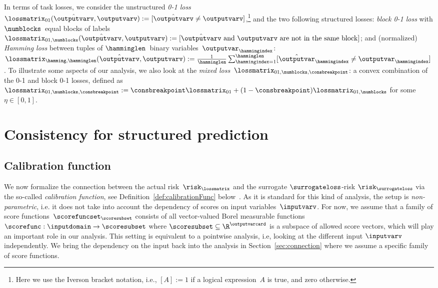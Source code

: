 \documentclass{article}
\begin{document}
In terms of task losses, we consider the unstructured \emph{0-1 loss} $\lossmatrix_{01}(\hat{\outputvarv}, \outputvarv) := [\hat{\outputvarv} \neq \outputvarv]$,\footnote{\label{footnote:Iverson}Here we use the Iverson bracket notation, i.e., $[A] := 1$ if a logical expression~$A$ is true, and zero otherwise.} and the two following structured losses: \emph{block 0-1 loss} with $\numblocks$~equal blocks of labels $\lossmatrix_{01,\numblocks}(\hat{\outputvarv}, \outputvarv) := [\text{$\hat{\outputvarv}$ and $\outputvarv$ are not in the same block}]$; and (normalized) \emph{Hamming loss} between tuples of $\hamminglen$~binary variables~$\outputvar_\hammingindex$: $\lossmatrix_{\hamming,\hamminglen}(\hat{\outputvarv}, \outputvarv)
:=
\frac{1}{\hamminglen}\sum\nolimits_{\hammingindex=1}^\hamminglen [\hat{\outputvar}_\hammingindex \neq \outputvar_\hammingindex]
$.
To illustrate some aspects of our analysis, we also look at the \emph{mixed loss}~$\lossmatrix_{01,\numblocks,\consbreakpoint}$: a convex combination of the 0-1 and block 0-1 losses, defined as $\lossmatrix_{01,\numblocks,\consbreakpoint} := \consbreakpoint \lossmatrix_{01} + (1 - \consbreakpoint) \lossmatrix_{01,\numblocks}$ for some $\eta \in [0,1]$.

\section{Consistency for structured prediction}
\label{sec:consistency}
\subsection{Calibration function}
We now formalize the connection between the actual risk~$\risk_\lossmatrix$ and the surrogate $\surrogateloss$-risk $\risk_\surrogateloss$ via the so-called \emph{calibration function}, see Definition~\ref{def:calibrationFunc} below~\citep{bartlett06convexity,zhang04,steinwart07,duchi10,pires2013riskbounds}.
As it is standard for this kind of analysis, the setup is \emph{non-parametric}, i.e. it does not take into account the dependency of scores on input variables~$\inputvarv$.
For now, we assume that a family of score functions~$\scorefuncset_\scoresubset$ consists of all vector-valued Borel measurable functions $\scorefunc: \inputdomain \to \scoresubset$ where $\scoresubset \subseteq \R^\outputvarcard$ is a subspace of allowed score vectors, which will play an important role in our analysis.
This setting is equivalent to a pointwise analysis, i.e, looking at the different input $\inputvarv$ independently.
We bring the dependency on the input back into the analysis in Section~\ref{sec:connection} where we assume a specific family of score functions.
%
\end{document}

